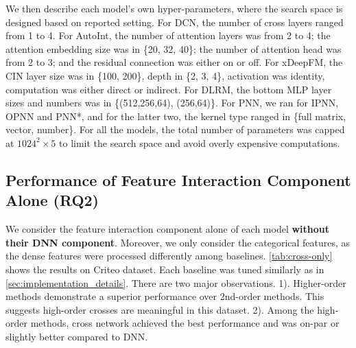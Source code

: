 \documentclass[sigconf]{acmart}
\begin{document}
We then describe each model's own hyper-parameters, where the search space is designed based on reported setting. For DCN, the number of cross layers ranged from 1 to 4. For AutoInt, the number of attention layers was from 2 to 4; the attention embedding size was in \{20, 32, 40\}; the number of attention head was from 2 to 3; and the residual connection was either on or off. For xDeepFM, the CIN layer size was in \{100, 200\}, depth in \{2, 3, 4\}, activation was identity, computation was either direct or indirect. For DLRM, the bottom MLP layer sizes and numbers was in \{(512,256,64), (256,64)\}. For PNN, we ran for IPNN, OPNN and PNN*, and for the latter two, the kernel type ranged in \{full matrix, vector, number\}.
For all the models, the total number of parameters was capped at $1024^2 \times 5$ to limit the search space and avoid overly expensive computations.

\subsection{Performance of Feature Interaction Component Alone (RQ2)}
\label{sec:performance_feature_interaction}
We consider the feature interaction component alone of each model {\bf without their DNN component}. Moreover, we only consider the categorical features, as the dense features were processed differently among baselines. \autoref{tab:cross-only} shows the results on Criteo dataset. Each baseline was tuned similarly as in \autoref{sec:implementation_details}. There are two major observations. 1). Higher-order methods demonstrate a superior performance over 2nd-order methods. This suggests high-order crosses are meaningful in this dataset. 2). Among the high-order methods, cross network achieved the best performance and was on-par or slightly better compared to DNN.
\end{document}
